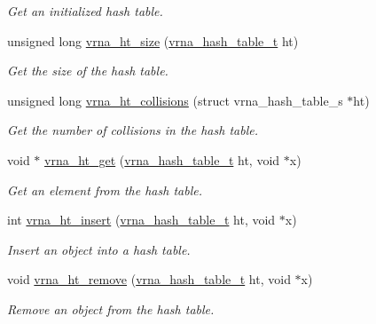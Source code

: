 \begin{DoxyCompactItemize}
\begin{DoxyCompactList}\small\item\em Get an initialized hash table. \end{DoxyCompactList}\item 
unsigned long \hyperlink{group__hash__table__utils_ga1d7a50bb20b32275e742ec575966412b}{vrna\+\_\+ht\+\_\+size} (\hyperlink{group__hash__table__utils_gabc7c6f41b718c8e23929e528891a89c4}{vrna\+\_\+hash\+\_\+table\+\_\+t} ht)
\begin{DoxyCompactList}\small\item\em Get the size of the hash table. \end{DoxyCompactList}\item 
unsigned long \hyperlink{group__hash__table__utils_ga928e7a27a9d34d254ce3855f1ab1d190}{vrna\+\_\+ht\+\_\+collisions} (struct vrna\+\_\+hash\+\_\+table\+\_\+s $\ast$ht)
\begin{DoxyCompactList}\small\item\em Get the number of collisions in the hash table. \end{DoxyCompactList}\item 
void $\ast$ \hyperlink{group__hash__table__utils_ga38f124472c8e7e75f067d3b27b43da09}{vrna\+\_\+ht\+\_\+get} (\hyperlink{group__hash__table__utils_gabc7c6f41b718c8e23929e528891a89c4}{vrna\+\_\+hash\+\_\+table\+\_\+t} ht, void $\ast$x)
\begin{DoxyCompactList}\small\item\em Get an element from the hash table. \end{DoxyCompactList}\item 
int \hyperlink{group__hash__table__utils_ga4d2189ce8048f031a15ca5e4b290d494}{vrna\+\_\+ht\+\_\+insert} (\hyperlink{group__hash__table__utils_gabc7c6f41b718c8e23929e528891a89c4}{vrna\+\_\+hash\+\_\+table\+\_\+t} ht, void $\ast$x)
\begin{DoxyCompactList}\small\item\em Insert an object into a hash table. \end{DoxyCompactList}\item 
void \hyperlink{group__hash__table__utils_ga1162aa0d1bd82af7420bb727a87d3e2f}{vrna\+\_\+ht\+\_\+remove} (\hyperlink{group__hash__table__utils_gabc7c6f41b718c8e23929e528891a89c4}{vrna\+\_\+hash\+\_\+table\+\_\+t} ht, void $\ast$x)
\begin{DoxyCompactList}\small\item\em Remove an object from the hash table. \end{DoxyCompactList}\item 

\end{DoxyCompactItemize}
